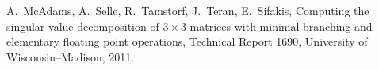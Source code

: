 A.~McAdams, A.~Selle, R.~Tamstorf, J.~Teran, E.~Sifakis,
\newblock Computing the singular value decomposition of $3\times3$ matrices with minimal branching and elementary floating point operations,
\newblock Technical Report 1690, University of Wisconsin--Madison, 2011.
